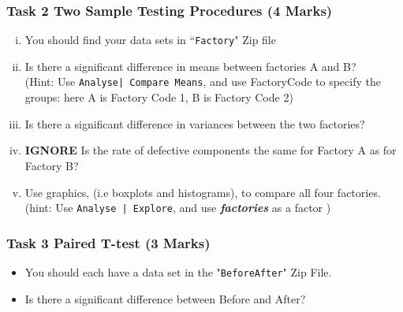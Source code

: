 \documentclass[a4paper,12pt]{article}
\begin{document}
\subsubsection*{Task 2 Two Sample Testing Procedures (4 Marks)}
\begin{enumerate}[(i)]
	\item You should find your data sets in ``\texttt{Factory}" Zip file
	\item Is there a significant difference in means between factories A and B?\\
	(Hint: Use \texttt{Analyse| Compare Means}, and use FactoryCode to specify the groups: here A is Factory Code 1, B is Factory Code 2)
	\item Is there a significant difference in variances between the two factories?
	\item  \textbf{IGNORE} Is the rate of defective components the same for Factory A as for Factory B? 
	\item Use graphics, (i.e boxplots and histograms), to compare all four factories.
	\\ (hint: Use \texttt{Analyse | Explore}, and use \textbf{\textit{factories}} as a factor )

\end{enumerate}
\bigskip
\subsubsection*{Task 3 Paired T-test (3 Marks) }
\begin{itemize}
	\item You should each have a data set in the "\texttt{BeforeAfter}" Zip File.
	\item Is there a significant difference between Before and After?

\end{itemize}
\bigskip
\end{document}
